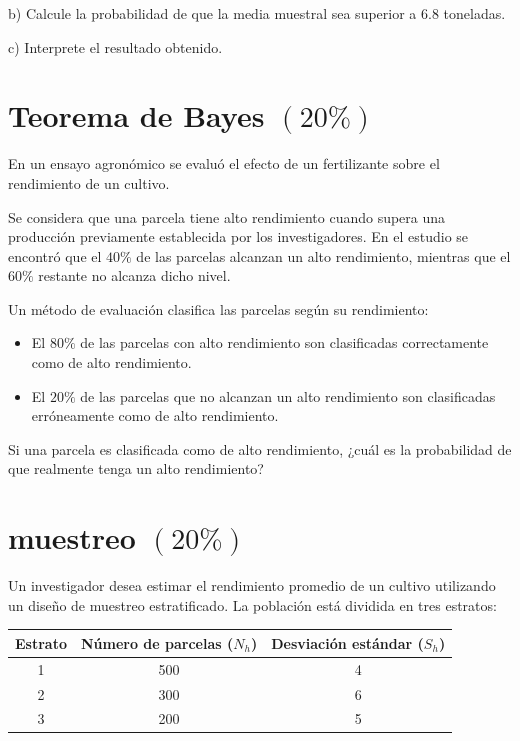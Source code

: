 \documentclass[12pt]{article}
\begin{document}
b) Calcule la probabilidad de que la media muestral sea superior a 6.8 toneladas.

c) Interprete el resultado obtenido.


\section{Teorema de Bayes $(20\%)$}
En un ensayo agronómico se evaluó el efecto de un fertilizante sobre el rendimiento de un cultivo.

Se considera que una parcela tiene alto rendimiento cuando supera una producción previamente establecida por los investigadores. En el estudio se encontró que el $40\%$ de las parcelas alcanzan un alto rendimiento, mientras que el $60\%$ restante no alcanza dicho nivel.

Un método de evaluación clasifica las parcelas según su rendimiento:

\begin{itemize}
    \item El $80\%$ de las parcelas con alto rendimiento son clasificadas correctamente como de alto rendimiento.
    \item El $20\%$ de las parcelas que no alcanzan un alto rendimiento son clasificadas erróneamente como de alto rendimiento.
\end{itemize}

Si una parcela es clasificada como de alto rendimiento, ¿cuál es la probabilidad de que realmente tenga un alto rendimiento?



\section{muestreo $(20\%)$}
Un investigador desea estimar el rendimiento promedio de un cultivo utilizando un diseño de muestreo estratificado. La población está dividida en tres estratos:

\begin{table}[H]
\centering
\begin{tabular}{ccc}
\hline
\textbf{Estrato} & \textbf{Número de parcelas ($N_h$)} & \textbf{Desviación estándar ($S_h$)} \\
\hline
1 & 500 & 4 \\
2 & 300 & 6 \\
3 & 200 & 5 \\
\hline
\end{tabular}
\end{table}
\end{document}
